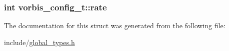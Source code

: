 \label{structvorbis__config__t_ad3f4331ef085115b3683f25680b32b19}
\hypertarget{structvorbis__config__t_ab83a7b52c88e2a6c12a827a303baab12}{
\subsubsection[{rate}]{\setlength{\rightskip}{0pt plus 5cm}int {\bf vorbis\_\-config\_\-t::rate}}}
\label{structvorbis__config__t_ab83a7b52c88e2a6c12a827a303baab12}


The documentation for this struct was generated from the following file:\begin{DoxyCompactItemize}
\item 
include/\hyperlink{global__types_8h}{global\_\-types.h}\end{DoxyCompactItemize}
